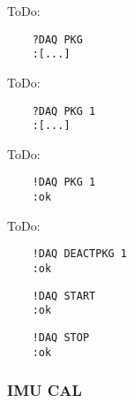 \textcolor[rgb]{0.75,0.75,0.75}{ToDo:}
\begin{verbatim}
	?DAQ PKG 
	:[...]
\end{verbatim}


\textcolor[rgb]{0.75,0.75,0.75}{ToDo:}
\begin{verbatim}
	?DAQ PKG 1
	:[...]
\end{verbatim}


\textcolor[rgb]{0.75,0.75,0.75}{ToDo:}
\begin{verbatim}
	!DAQ PKG 1 
	:ok
\end{verbatim}


\textcolor[rgb]{0.75,0.75,0.75}{ToDo:}
\begin{verbatim}
	!DAQ DEACTPKG 1
	:ok
\end{verbatim}



\begin{verbatim}
	!DAQ START
	:ok
\end{verbatim}


\begin{verbatim}
	!DAQ STOP
	:ok
\end{verbatim}



\subsubsection{IMU CAL}






